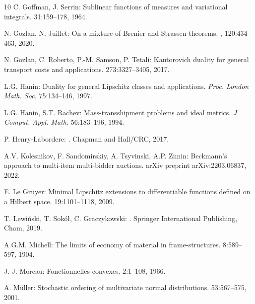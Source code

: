 \documentclass[11pt,letterpaper,reqno]{amsart}
\theoremstyle{definition}
\numberwithin{equation}{section}
\begin{document}
{\begin{thebibliography}{10}
	C. Goffman, J. Serrin:
	\newblock Sublinear functions of measures and variational integrals.
	 31:159--178, 1964.
	
	N. Gozlan, N. Juillet:
	\newblock On a mixture of Brenier and Strassen theorems.
	,
	120:434--463, 2020.
	
	N. Gozlan, C. Roberto, P.-M. Samson, P. Tetali:
	\newblock Kantorovich duality for general transport costs and applications.
	 273:3327--3405, 2017.
	

	
	L.G. Hanin:
	\newblock  Duality for general Lipschitz classes and applications.
	\newblock
	{\em Proc. London Math. Soc.} 75:134--146, 1997.
	
	L.G. Hanin, S.T. Rachev:
	\newblock Mass-transshipment problems and ideal metrics.
	\newblock
	{\em J. Comput. Appl. Math.} 56:183--196, 1994.
	
	P. Henry-Labordere:
	.
	\newblock  Chapman and Hall/CRC, 2017.
	
	
	A.V. Kolesnikov, F. Sandomirskiy, A. Tsyvinski,  A.P. Zimin:
	\newblock Beckmann's approach to multi-item multi-bidder auctions.
	\newblock arXiv preprint arXiv:2203.06837, 2022.

	
	E. Le Gruyer:
	\newblock Minimal Lipschitz extensions to differentiable functions defined on a
	Hilbert space.
	 19:1101--1118, 2009.
	
	T. Lewi{\'{n}}ski, T. Sok{\'o}{\l}, C. Graczykowski:
	.
	\newblock Springer International Publishing, Cham, 2019.
	
	A.G.M. Michell:
	\newblock The limits of economy of material in frame-structures.
	 8:589--597, 1904.
	
	J.-J. Moreau:
	\newblock Fonctionnelles convexes.
	 2:1--108, 1966.
	
	A. M\"{u}ller:
	\newblock Stochastic ordering of multivariate normal distributions.
	 53:567--575, 2001.
	

\end{thebibliography}}
\end{document}
